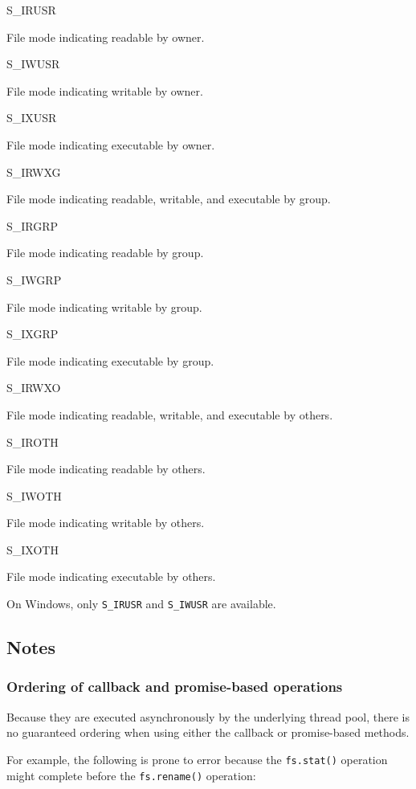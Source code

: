 S\_IRUSR

File mode indicating readable by owner.

S\_IWUSR

File mode indicating writable by owner.

S\_IXUSR

File mode indicating executable by owner.

S\_IRWXG

File mode indicating readable, writable, and executable by group.

S\_IRGRP

File mode indicating readable by group.

S\_IWGRP

File mode indicating writable by group.

S\_IXGRP

File mode indicating executable by group.

S\_IRWXO

File mode indicating readable, writable, and executable by others.

S\_IROTH

File mode indicating readable by others.

S\_IWOTH

File mode indicating writable by others.

S\_IXOTH

File mode indicating executable by others.

On Windows, only \texttt{S\_IRUSR} and \texttt{S\_IWUSR} are available.

\subsection{Notes}\label{notes}

\subsubsection{Ordering of callback and promise-based
operations}\label{ordering-of-callback-and-promise-based-operations}

Because they are executed asynchronously by the underlying thread pool,
there is no guaranteed ordering when using either the callback or
promise-based methods.

For example, the following is prone to error because the
\texttt{fs.stat()} operation might complete before the
\texttt{fs.rename()} operation:


